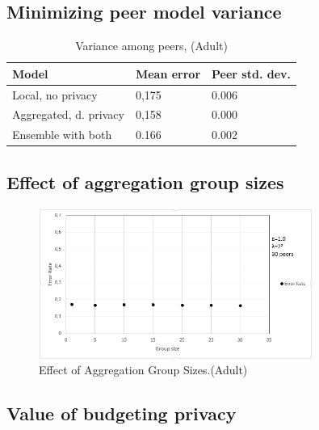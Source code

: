 \subsection{Minimizing peer model variance}
\begin{table}[H]
	\centering

	\begin{tabular}{|l|l|l|}
		\textbf{Model}                  & \textbf{Mean error} & \textbf{Peer std. dev.} \\
		\hline
		Local, no privacy      & 0,175 & 0.006 \\
		Aggregated, d. privacy & 0,158 & 0.000	 \\
		Ensemble with both & 0.166 & 0.002 \\
	\end{tabular}
	\caption{Variance among peers, (Adult)}
	\label{table:peer_variance_adult}
\end{table}      

\subsection{Effect of aggregation group sizes}
\begin{figure}[H]
	\centering
	\includegraphics[width=0.8\textwidth]{fig/adult/GroupSizeTest}
	\caption{Effect of Aggregation Group Sizes.(Adult)}
	\label{fig:results_group_sizes}
\end{figure}




\subsection{Value of budgeting privacy}


